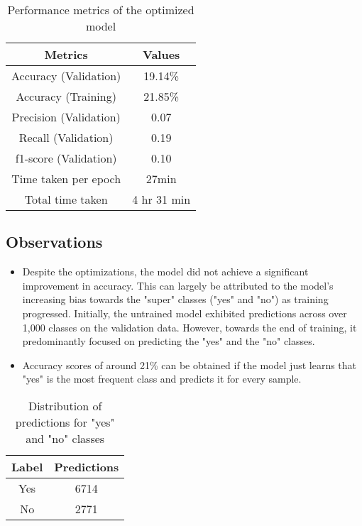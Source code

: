 \documentclass[conference]{IEEEtran}
\begin{document}
\begin{table}[H]
    \centering
    \begin{tabular}{|c|c|}
        \hline
        \textbf{Metrics} & \textbf{Values} \\
        \hline
        Accuracy (Validation) & 19.14\% \\
        Accuracy (Training) & 21.85\% \\
        Precision (Validation) & 0.07 \\
        Recall (Validation) & 0.19 \\
        f1-score (Validation) & 0.10 \\
        Time taken per epoch & 27min \\
        Total time taken & 4 hr 31 min \\ 
        \hline
    \end{tabular}
    \vspace{1mm}
    \caption{Performance metrics of the optimized model}
\end{table}

\subsection*{Observations}
\begin{itemize}
    \item Despite the optimizations, the model did not achieve a significant improvement in accuracy. This can largely be attributed to the model's increasing bias towards the "super" classes ("yes" and "no") as training progressed. Initially, the untrained model exhibited predictions across over 1,000 classes on the validation data. However, towards the end of training, it predominantly focused on predicting the "yes" and the "no" classes.
    \item Accuracy scores of around 21\% can be obtained if the model just learns that "yes" is the most frequent class and predicts it for every sample.
\end{itemize}


\begin{table}[H]
    \centering
    \begin{tabular}{|c|c|}
        \hline
        \textbf{Label} & \textbf{Predictions} \\
        \hline
        Yes & 6714 \\
        No & 2771 \\
        \hline
    \end{tabular}
    \vspace{1mm}
    \caption{Distribution of predictions for "yes" and "no" classes}
\end{table}
\end{document}
